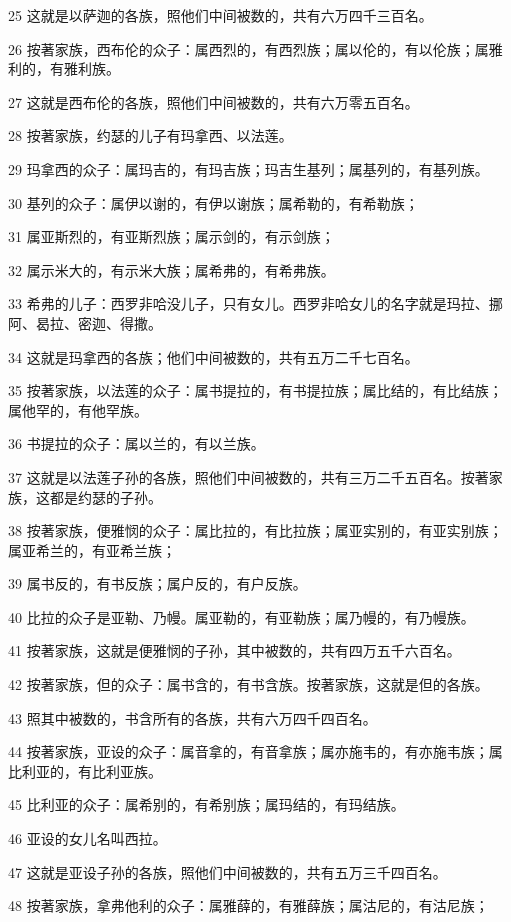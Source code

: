 \par 25 这就是以萨迦的各族，照他们中间被数的，共有六万四千三百名。
\par 26 按著家族，西布伦的众子：属西烈的，有西烈族；属以伦的，有以伦族；属雅利的，有雅利族。
\par 27 这就是西布伦的各族，照他们中间被数的，共有六万零五百名。
\par 28 按著家族，约瑟的儿子有玛拿西、以法莲。
\par 29 玛拿西的众子：属玛吉的，有玛吉族；玛吉生基列；属基列的，有基列族。
\par 30 基列的众子：属伊以谢的，有伊以谢族；属希勒的，有希勒族；
\par 31 属亚斯烈的，有亚斯烈族；属示剑的，有示剑族；
\par 32 属示米大的，有示米大族；属希弗的，有希弗族。
\par 33 希弗的儿子：西罗非哈没儿子，只有女儿。西罗非哈女儿的名字就是玛拉、挪阿、曷拉、密迦、得撒。
\par 34 这就是玛拿西的各族；他们中间被数的，共有五万二千七百名。
\par 35 按著家族，以法莲的众子：属书提拉的，有书提拉族；属比结的，有比结族；属他罕的，有他罕族。
\par 36 书提拉的众子：属以兰的，有以兰族。
\par 37 这就是以法莲子孙的各族，照他们中间被数的，共有三万二千五百名。按著家族，这都是约瑟的子孙。
\par 38 按著家族，便雅悯的众子：属比拉的，有比拉族；属亚实别的，有亚实别族；属亚希兰的，有亚希兰族；
\par 39 属书反的，有书反族；属户反的，有户反族。
\par 40 比拉的众子是亚勒、乃幔。属亚勒的，有亚勒族；属乃幔的，有乃幔族。
\par 41 按著家族，这就是便雅悯的子孙，其中被数的，共有四万五千六百名。
\par 42 按著家族，但的众子：属书含的，有书含族。按著家族，这就是但的各族。
\par 43 照其中被数的，书含所有的各族，共有六万四千四百名。
\par 44 按著家族，亚设的众子：属音拿的，有音拿族；属亦施韦的，有亦施韦族；属比利亚的，有比利亚族。
\par 45 比利亚的众子：属希别的，有希别族；属玛结的，有玛结族。
\par 46 亚设的女儿名叫西拉。
\par 47 这就是亚设子孙的各族，照他们中间被数的，共有五万三千四百名。
\par 48 按著家族，拿弗他利的众子：属雅薛的，有雅薛族；属沽尼的，有沽尼族；
